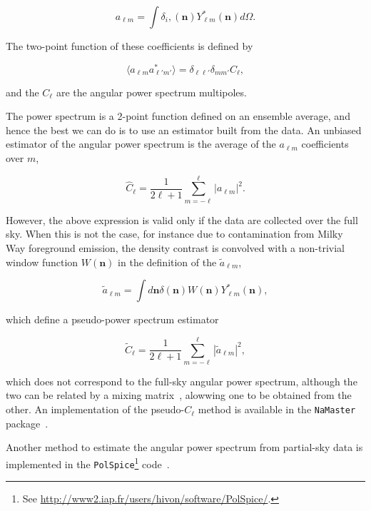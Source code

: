 \documentclass[%
preprint,
nofootinbib,
 amsmath,amssymb,
 aps,
]{revtex4-2}
\begin{document}
\begin{equation}
	a_{\ell m} = \int \delta_i, (\bm{n}) Y^*_{\ell m} (\bm{n}) d\Omega.
\end{equation}

The two-point function of these coefficients is defined by

\begin{equation}
	\langle a_{\ell m} a^*_{\ell' m'} \rangle = \delta_{\ell \ell'} \delta_{m m'} C_\ell,
\end{equation}

and the $C_\ell$ are the angular power spectrum multipoles.

The power spectrum is a 2-point function defined on an ensemble average, and hence the best we can
do is to use an estimator built from the data. An unbiased estimator of the angular power spectrum
is the average of the $a_{\ell m}$ coefficients over $m$,

\begin{equation}
	\hat{C}_\ell = \frac{1}{2 \ell + 1} \sum_{m = -\ell}^{\ell} | a_{\ell m} | ^2.
\end{equation}

However, the above expression is valid only if the data are collected over the full sky. When this
is not the case, for instance due to contamination from Milky Way foreground emission, the density
contrast is convolved with a non-trivial window function $W(\bm{n})$ in the definition of the
$\tilde{a}_{\ell m}$,

\begin{equation}
	\tilde{a}_{\ell m} = \int d \bm{n} \delta(\bm{n}) W(\bm{n}) Y^*_{\ell m}(\bm{n}),
\end{equation}

which define a pseudo-power spectrum estimator

\begin{equation}
	\tilde{C}_\ell = \frac{1}{2 \ell + 1} \sum_{m = -\ell}^{\ell} | \tilde{a}_{\ell m} | ^2,
\end{equation}

which does not correspond to the full-sky angular power spectrum, although the two can be related
by a mixing matrix~\cite{Hivon:2001jp}, alowwing one to be obtained from the other. An
implementation of the pseudo-$C_\ell$ method is available in the \texttt{NaMaster}
package~\cite{Alonso:2018jzx}.

Another method to estimate the angular power spectrum from partial-sky data is implemented in the
\texttt{PolSpice}\footnote{See \url{http://www2.iap.fr/users/hivon/software/PolSpice/}.}
code~\cite{Szapudi_2001,Chon:2003gx}.
\end{document}
